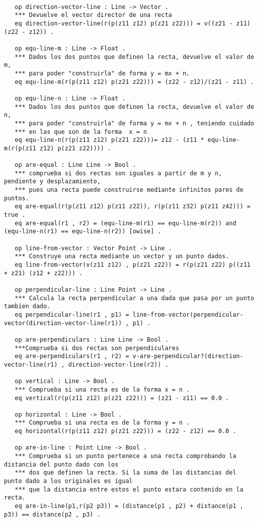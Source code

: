 \begin{verbatim}

   op direction-vector-line : Line -> Vector .
   *** Devuelve el vector director de una recta
   eq direction-vector-line(r(p(z11 z12) p(z21 z22))) = v((z21 - z11) (z22 - z12)) .

   op equ-line-m : Line -> Float .
   *** Dados los dos puntos que definen la recta, devuelve el valor de m, 
   *** para poder "construirla" de forma y = mx + n.
   eq equ-line-m(r(p(z11 z12) p(z21 z22))) = (z22 - z12)/(z21 - z11) .

   op equ-line-n : Line -> Float .
   *** Dados los dos puntos que definen la recta, devuelve el valor de n, 
   *** para poder "construirla" de forma y = mx + n , teniendo cuidado 
   *** en las que son de la forma  x = n
   eq equ-line-n(r(p(z11 z12) p(z21 z22)))= z12 - (z11 * equ-line-m(r(p(z11 z12) p(z21 z22)))) .

   op are-equal : Line Line -> Bool .
   *** comprueba si dos rectas son iguales a partir de m y n, pendiente y desplazamiento, 
   *** pues una recta puede construirse mediante infinitos pares de puntos.
   eq are-equal(r(p(z11 z12) p(z11 z22)), r(p(z11 z32) p(z11 z42))) = true . 
   eq are-equal(r1 , r2) = (equ-line-m(r1) == equ-line-m(r2)) and (equ-line-n(r1) == equ-line-n(r2)) [owise] .

   op line-from-vector : Vector Point -> Line .
   *** Construye una recta mediante un vector y un punto dados.
   eq line-from-vector(v(z11 z12) , p(z21 z22)) = r(p(z21 z22) p((z11 + z21) (z12 + z22))) .

   op perpendicular-line : Line Point -> Line .
   *** Calcula la recta perpendicular a una dada que pasa por un punto tambien dado.	
   eq perpendicular-line(r1 , p1) = line-from-vector(perpendicular-vector(direction-vector-line(r1)) , p1) .

   op are-perpendiculars : Line Line -> Bool .
   ***Comprueba si dos rectas son perpendiculares
   eq are-perpendiculars(r1 , r2) = v-are-perpendicular?(direction-vector-line(r1) , direction-vector-line(r2)) .

   op vertical : Line -> Bool .
   *** Comprueba si una recta es de la forma x = n .
   eq vertical(r(p(z11 z12) p(z21 z22))) = (z21 - z11) == 0.0 .

   op horizontal : Line -> Bool .
   *** Comprueba si una recta es de la forma y = n .
   eq horizontal(r(p(z11 z12) p(z21 z22))) = (z22 - z12) == 0.0 .
	
   op are-in-line : Point Line -> Bool .
   *** Comprueba si un punto pertenece a una recta comprobando la distancia del punto dado con los
   *** dos que definen la recta. Si la suma de las distancias del punto dado a los originales es igual 
   *** que la distancia entre estos el punto estara contenido en la recta.
   eq are-in-line(p1,r(p2 p3)) = (distance(p1 , p2) + distance(p1 , p3)) == distance(p2 , p3) . 

\end{verbatim}

